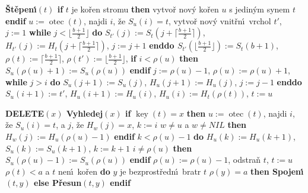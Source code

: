 \documentclass[a4paper,12pt]{article}
\DeclareMathOperator*{\otec}{otec}
\DeclareMathOperator*{\key}{key}
\begin{document}
{\bf \v St\v epen\'\i$(t)$\newline 
if} $t$ je ko\v ren stromu {\bf then}\newline 
\phantom{---}vytvo\v r nov\'y ko\v ren $u$ s jedin\'ym synem $t$\newline 
{\bf endif}\newline 
$u:=\otec(t)$, najdi $i$, \v ze $S_u(i)=t$,\newline 
vytvo\v r nov\'y vnit\v rn\'\i\ vrchol $t'$, $j:=1$\newline 
{\bf while} $j<\lfloor\frac {b+1}2\rfloor$ {\bf do}\newline 
\phantom{---}$S_{t'}(j):=S_t(j+\lceil\frac {b+1}2\rceil )$, $H_{t'}(j):=H_t(j+\lceil\frac {b+1}2\rceil)$, $j:=j+1$\newline 
{\bf enddo\newline 
$S_{t'}(\lfloor\frac {b+1}2\rfloor ):=S_t(b+1)$}, $\rho (t):=\lceil\frac {
b+1}2\rceil$, $\rho (t'):=\lfloor\frac {b+1}2\rfloor$,\newline 
{\bf if} $i<\rho (u)$ {\bf then} $S_u(\rho (u)+1):=S_u(\rho (u))$ {\bf endif\newline}
$j:=\rho (u)-1$, $\rho (u):=\rho (u)+1$,\newline 
{\bf while} $j>i$ {\bf do}\newline 
\phantom{---}$S_u(j+1):=S_u(j)$, $H_u(j+1):=H_u(j)$, $j:=j-1$\newline 
{\bf enddo\newline 
$S_u(i+1):=t'$}, $H_u(i+1):=H_u(i)$, $H_u(i):=H_t(\rho (t))$, 
$t:=u$
\medskip

{\bf DELETE$(x)$\newline 
Vyhledej$(x)$\newline 
if} $\key(t)=x$ {\bf then}\newline 
\phantom{---}$u:=\otec(t)$, najdi $i$, \v ze $S_u(i)=t$, a $j$, \v ze $H_w(j)=x$, $k:=i$\newline 
\phantom{---}{\bf if} $w\ne u$ a $w\ne NIL$ {\bf then} $H_w(j):=H_u(\rho (u)-1)$ {\bf endif}\newline 
\phantom{---}{\bf while} $k<\rho (u)-1$ {\bf do}\newline 
\phantom{------}$H_u(k):=H_u(k+1)$, $S_u(k):=S_u(k+1)$, $k:=k+1$ \newline 
\phantom{---}{\bf enddo}\newline 
\phantom{---}{\bf if} $i\ne\rho(u)$ {\bf then} $S_u(\rho (u)-1):=S_u(\rho (u))$ {\bf endif}\newline
\phantom{---}$\rho (u):=\rho (u)-1$, odstra\v n $t$, $t:=u$ \newline 
\phantom{---}{\bf while} $\rho (t)<a$ a $t$ nen\'\i\ ko\v ren {\bf do}\newline 
\phantom{------}$y$ je bezprost\v redn\'\i\ bratr $t$\newline 
\phantom{------}{\bf if} $\rho (y)=a$ {\bf then Spojen\'\i$(t,y)$ else P\v resun$
(t,y)$ endif}\newline 
\phantom{---}{\bf enddo\newline 
endif}
\medskip
\end{document}

